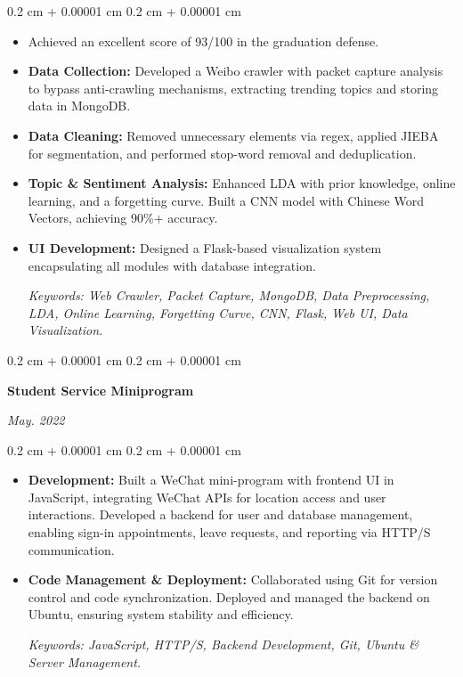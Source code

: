 \documentclass[10pt, letterpaper]{article}
\newenvironment{highlights}{
    \begin{itemize}[
        topsep=0.10 cm,
        parsep=0.10 cm,
        partopsep=0pt,
        itemsep=0pt,
        leftmargin=0.4 cm + 10pt
    ]
}{
    \end{itemize}
} %
\newenvironment{onecolentry}{
    \begin{adjustwidth}{
        0.2 cm + 0.00001 cm
    }{
        0.2 cm + 0.00001 cm
    }
}{
    \end{adjustwidth}
} %
\newenvironment{twocolentry}[2][]{
    \onecolentry
    \def\secondColumn{#2}
    \setcolumnwidth{\fill, 6 cm}
    \begin{paracol}{2}
}{
    \switchcolumn \raggedleft \secondColumn
    \end{paracol}
    \endonecolentry
} %
\begin{document}
    \vspace{0.10 cm}
    \begin{onecolentry}
        \begin{highlights}
            \item Achieved an excellent score of 93/100 in the graduation defense.  
            \item \textbf{Data Collection:} Developed a Weibo crawler with packet capture analysis to bypass anti-crawling mechanisms, extracting trending topics and storing data in MongoDB.
            \item \textbf{Data Cleaning:} Removed unnecessary elements via regex, applied JIEBA for segmentation, and performed stop-word removal and deduplication. 
            \item \textbf{Topic \& Sentiment Analysis:} Enhanced LDA with prior knowledge, online learning, and a forgetting curve. Built a CNN model with Chinese Word Vectors, achieving 90\%+ accuracy. 
            \item \textbf{UI Development:} Designed a Flask-based visualization system encapsulating all modules with database integration. \par
            \textit{Keywords: Web Crawler, Packet Capture, MongoDB, Data Preprocessing, LDA, Online Learning, Forgetting Curve, CNN, Flask, Web UI, Data Visualization.}
        \end{highlights}
    \end{onecolentry}
    

        
        \vspace{0.2 cm}
        
        \begin{twocolentry}{
            
            
        \textit{May. 2022}
        }
            \textbf{Student Service Miniprogram}
        \end{twocolentry}

        \vspace{0.10 cm}
        \begin{onecolentry}
            \begin{highlights}
                \item \textbf{Development:} Built a WeChat mini-program with frontend UI in JavaScript, integrating WeChat APIs for location access and user interactions. Developed a backend for user and database management, enabling sign-in appointments, leave requests, and reporting via HTTP/S communication. 
                \item \textbf{Code Management \& Deployment:} Collaborated using Git for version control and code synchronization. Deployed and managed the backend on Ubuntu, ensuring system stability and efficiency. \par
                \textit{Keywords: JavaScript, HTTP/S, Backend Development, Git, Ubuntu \& Server Management.}
            \end{highlights}
        \end{onecolentry}
\end{document}
